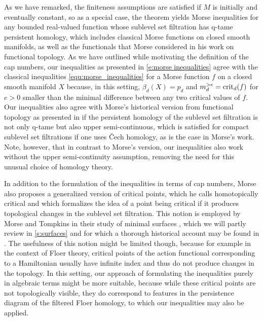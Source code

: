 As we have remarked, the finiteness assumptions are satisfied if $M$ is initially and eventually constant, so as a special case, the theorem yields Morse inequalities for any bounded real-valued function whose sublevel set filtration has q-tame persistent homology, which includes classical Morse functions on closed smooth manifolds, as well as the functionals that Morse considered in his work on functional topology.
As we have outlined while motivating the definition of the cap numbers, our inequalities as presented in \eqref{e:morse inequalities} agree with the classical inequalities \eqref{equ:morse_inequalities} for a Morse function $f$ on a closed smooth manifold $X$ because, in this setting, $\beta_d(X) = p_d$ and $m_d^{>e} = \operatorname{crit}_d(f)$ for $e > 0$ smaller than the minimal difference between any two critical values of $f$.
Our inequalities also agree with Morse's historical version from functional topology as presented in \cite{Morse.1940} if the persistent homology of the sublevel set filtration is not only q-tame but also upper semi-continuous, which is satisfied for compact sublevel set filtrations if one uses \v{C}ech homology, as is the case in Morse's work.
Note, however, that in contrast to Morse's version, our inequalities also work without the upper semi-continuity assumption, removing the need for this unusual choice of homology theory.

\begin{rem}
	In addition to the formulation of the inequalities in terms of cap numbers, Morse also proposes a generalized version of critical points, which he calls homotopically critical and which formalizes the idea of a point being critical if it produces topological changes in the sublevel set filtration.
	This notion is employed by Morse and Tompkins in their study of minimal surfaces \cite{Morse.1939}, which we will partly review in \cref{s:surfaces} and for which a thorough historical account may be found in \cite[Section II.6]{Struwe.1988}.
	The usefulness of this notion might be limited though, because for example in the context of Floer theory, critical points of the action functional corresponding to a Hamiltonian usually have infinite index and thus do not produce changes in the topology.
	In this setting, our approach of formulating the inequalities purely in algebraic terms might be more suitable, because while these critical points are not topologically visible, they do correspond to features in the persistence diagram of the filtered Floer homology, to which our inequalities may also be applied.
\end{rem}
